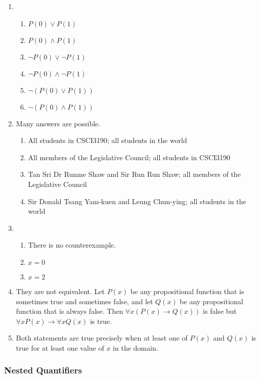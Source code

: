 \documentclass{sig-alternate-05-2015}
\begin{document}
\begin{enumerate}
\item 
\begin{enumerate}
	\item $P(0) \vee P(1)$
	\item $P(0) \wedge P(1)$
	\item $\neg P(0) \vee \neg P(1)$
	\item $\neg P(0) \wedge \neg P(1)$
	\item $\neg(P(0) \vee P(1))$
	\item $\neg(P(0) \wedge P(1))$
\end{enumerate}

\item Many answers are possible.
\begin{enumerate}
	\item All students in CSCI3190; all students in	the world
	\item All members of the Legislative Council; all students in CSCI3190
	\item Tan Sri Dr Runme Shaw and Sir Run Run Shaw; all members of the Legislative Council
	\item Sir Donald Tsang Yam-kuen and Leung Chun-ying; all students in the world
\end{enumerate}

\item 
\begin{enumerate}
	\item There is no counterexample.
	\item $x = 0$
	\item $x = 2$
\end{enumerate}

\item They are not equivalent.
Let $P(x)$ be any propositional function that is sometimes
true and sometimes false, and let $Q(x)$ be any propositional
function that is always false. Then $\forall x (P(x) \rightarrow Q(x))$ is false
but $\forall x P(x) \rightarrow \forall x Q(x)$ is true.

\item Both statements are
true precisely when at least one of $P(x)$ and $Q(x)$ is true for
at least one value of $x$ in the domain.

\end{enumerate}

\subsubsection{Nested Quantifiers}
\end{document}
